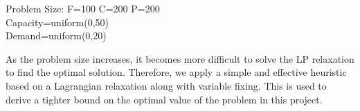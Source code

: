 \documentclass[12pt]{article}
\numberwithin{equation}{section}
\begin{document}
Problem Size: F=100 C=200 P=200\\
Capacity=uniform(0,50)\\
Demand=uniform(0,20)\\

\begin{table}[H]
\centering
\caption{Comparison of IP with LP}
\end{table}
As the problem size increases, it becomes more difficult to solve the LP relaxation to find the optimal solution. Therefore, we apply a simple and effective heuristic based on a Lagrangian relaxation along with variable fixing. This is used to derive a tighter bound on the optimal value of the problem in this project.
\end{document}
